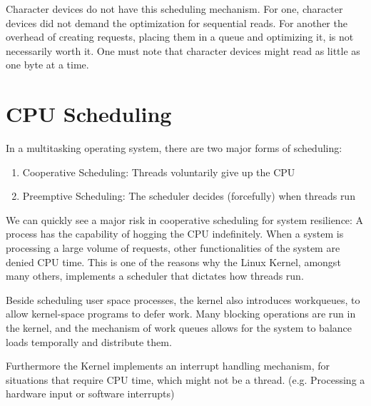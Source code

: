 Character devices do not have this scheduling mechanism. For one, character devices did not demand the optimization for sequential reads. For another the overhead of creating requests, placing them in a queue and optimizing it, is not necessarily worth it. One must note that character devices might read as little as one byte at a time.

\section{CPU Scheduling}
In a multitasking operating system, there are two major forms of scheduling:
\begin{enumerate}
\item Cooperative Scheduling: Threads voluntarily give up the CPU
\item Preemptive Scheduling: The scheduler decides (forcefully) when threads run
\end{enumerate}

We can quickly see a major risk in cooperative scheduling for system resilience: A process has the capability of hogging the CPU indefinitely. When a system is processing a large volume of requests, other functionalities of the system are denied CPU time.
This is one of the reasons why the Linux Kernel, amongst many others, implements a scheduler that dictates how threads run.

Beside scheduling user space processes, the kernel also introduces workqueues\cite{workqueue}, to allow kernel-space programs to defer work. Many blocking operations are run in the kernel, and the mechanism of work queues allows for the system to balance loads temporally and distribute them.

Furthermore the Kernel implements an interrupt handling mechanism, for situations that require CPU time, which might not be a thread. (e.g. Processing a hardware input or software interrupts)
